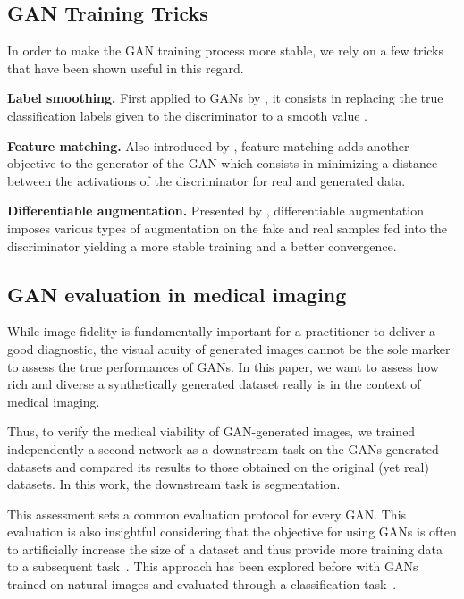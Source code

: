 \documentclass[preprint,12pt, authoryear]{elsarticle}
\begin{document}
\subsection{GAN Training Tricks}
In order to make the GAN training process more stable, we rely on a few tricks that have been shown useful in this regard.

\textbf{Label smoothing.} First applied to GANs by \cite{Salimans2016ImprovedTF}, it consists in replacing the true classification labels given to the discriminator to a smooth value .

\textbf{Feature matching.} Also introduced by \cite{Salimans2016ImprovedTF}, feature matching adds another objective to the generator of the GAN which consists in minimizing a distance between the activations of the discriminator for real and generated data.

\textbf{Differentiable augmentation.} Presented by \cite{Zhao2020DifferentiableAF}, differentiable augmentation imposes various types of augmentation on the fake and real samples fed into the discriminator yielding a more stable training and a better convergence.


\subsection{GAN evaluation in medical imaging}
While image fidelity is fundamentally important for a practitioner to deliver a good diagnostic, the visual acuity of generated images cannot be the sole marker to assess the true performances of GANs.  In this paper, we want to assess how rich and diverse a synthetically generated dataset really is in the context of medical imaging.  

Thus, to verify the medical viability of GAN-generated images, we trained independently a second network as a downstream task on the GANs-generated datasets and compared its results to those obtained on the original (yet real) datasets.  In this work, the downstream task is segmentation.

This assessment sets a common evaluation protocol for every GAN.  This evaluation is also insightful considering that the objective for using GANs is often to artificially increase the size of a dataset and thus provide more training data to a subsequent task~\citep{Skandarani2020OnTE, Shin2018MedicalIS}. This approach has been explored before with GANs trained on natural images and evaluated through a classification task~\citep{Ravuri2019ClassificationAS,Shmelkov2018HowGI}.
\end{document}
